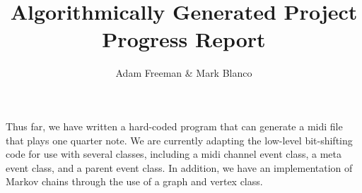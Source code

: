 \documentclass [12pt]{article}
\begin{document}
\title {Algorithmically Generated Project Progress Report}
\author {Adam Freeman & Mark Blanco}
\maketitle
Thus far, we have written a hard-coded program that can generate a midi file that plays one quarter note. We are currently adapting the low-level bit-shifting code for use with several classes, including a midi channel event class, a meta event class, and a parent event class. In addition, we have an implementation of Markov chains through the use of a graph and vertex class. 
\end{document}
